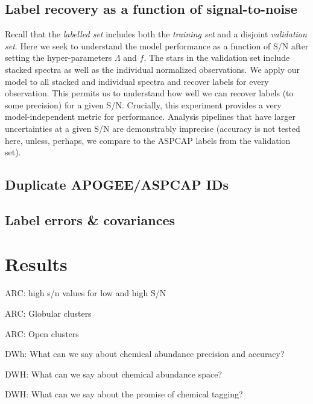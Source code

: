 \documentclass[12pt,preprint]{aastex}
\begin{document}
\subsection{Label recovery as a function of signal-to-noise}
\label{sec:label-recovery-snr}

Recall that the \emph{labelled set} includes both the \emph{training set} and
a disjoint \emph{validation set}.  Here we seek to understand the model performance
as a function of S/N after setting the hyper-parameters $\Lambda$ and $f$.
The stars in the validation set include stacked
spectra as well as the individual normalized observations.  We apply our model to
all stacked and individual spectra and recover labels for every observation. 
This permits us to understand how well we can recover labels (to some precision)
for a given S/N.  Crucially, this experiment provides a very model-independent
metric for performance.  Analysis pipelines that have larger uncertainties
at a given S/N are demonstrably imprecise (accuracy is not tested here, unless,
perhaps, we compare to the ASPCAP labels from the validation set).



\subsection{Duplicate APOGEE/ASPCAP IDs}
\label{sec:duplicate-ids}

\subsection{Label errors \& covariances}
\label{sec:errors}



\section{Results}
\label{sec:results}

ARC: high s/n values for low and high S/N

ARC: Globular clusters

ARC: Open clusters




DWh: What can we say about chemical abundance precision and accuracy?

DWH: What can we say about chemical abundance space?

DWH: What can we say about the promise of chemical tagging?
\end{document}
